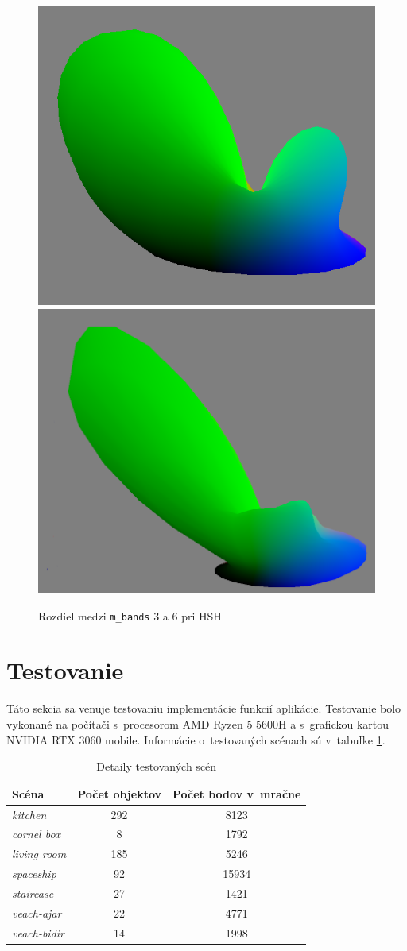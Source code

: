 \begin{figure}[b!]\label{mBands}
    \centering
    \includegraphics[width=0.48\linewidth]{obrazky-figures/mBands3.png}
    \includegraphics[width=0.50\linewidth]{obrazky-figures/mband_6.png}
    \caption{Rozdiel medzi \texttt{m\_bands} 3 a 6 pri HSH}
\end{figure}

\section{Testovanie}
Táto sekcia sa venuje testovaniu implementácie funkcií aplikácie. Testovanie bolo vykonané na počítači s~procesorom AMD Ryzen 5 5600H a s~grafickou kartou NVIDIA RTX 3060 mobile. Informácie o~testovaných scénach sú v~tabuľke \ref{SceneDetail}.

\begin{table}[h!] \label{SceneDetail}
\centering
\begin{tabular}{|l|c|c|}
\hline
\textbf{Scéna} & \textbf{Počet objektov} & \textbf{Počet bodov v~mračne}   \\ \hline
\textit{kitchen} & 292 & 8123 \\ \hline
\textit{cornel box} & 8 & 1792 \\ \hline
\textit{living room} & 185 & 5246 \\ \hline
\textit{spaceship} & 92 & 15934 \\ \hline
\textit{staircase} & 27 & 1421 \\ \hline
\textit{veach-ajar} & 22 & 4771 \\ \hline
\textit{veach-bidir} & 14 & 1998 \\ \hline
\end{tabular}
\caption{Detaily testovaných scén}
\end{table}

